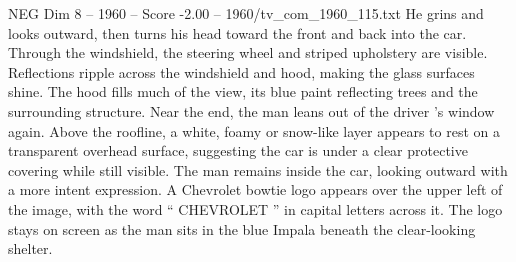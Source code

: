 \begin{textsample}{NEG Dim 8 – 1960 – Score -2.00 – 1960/tv\_com\_1960\_115.txt}
He grins and looks outward, then turns his head toward the front and back into the car.
Through the windshield, the steering wheel and striped upholstery are visible.
Reflections ripple across the windshield and hood, making the glass surfaces shine.
The hood fills much of the view, its blue paint reflecting trees and the surrounding structure.
Near the end, the man leans out of the driver ’s window again.
Above the roofline, a white, foamy or snow-like layer appears to rest on a transparent overhead surface, suggesting the car is under a clear protective covering while still visible.
The man remains inside the car, looking outward with a more intent expression.
A Chevrolet bowtie logo appears over the upper left of the image, with the word “ CHEVROLET ” in capital letters across it.
The logo stays on screen as the man sits in the blue Impala beneath the clear-looking shelter.

\end{textsample}
